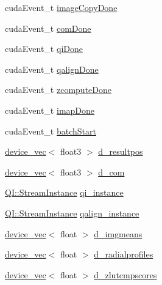 \begin{DoxyCompactItemize}
\item 
cuda\+Event\+\_\+t \hyperlink{struct_queued_c_u_d_a_tracker_1_1_stream_aca5f13276c563f05d5bf931de3fadc37}{image\+Copy\+Done}
\item 
cuda\+Event\+\_\+t \hyperlink{struct_queued_c_u_d_a_tracker_1_1_stream_a00f82cbaf986970a7a37ab1b667f9d70}{com\+Done}
\item 
cuda\+Event\+\_\+t \hyperlink{struct_queued_c_u_d_a_tracker_1_1_stream_a3bf78dd2104f2b82ecd8f1bc6697c818}{qi\+Done}
\item 
cuda\+Event\+\_\+t \hyperlink{struct_queued_c_u_d_a_tracker_1_1_stream_acfa8afce2f50edaab1379f929f250533}{qalign\+Done}
\item 
cuda\+Event\+\_\+t \hyperlink{struct_queued_c_u_d_a_tracker_1_1_stream_aa61e1ea38a74c9bd32435bd1ba0eb4d4}{zcompute\+Done}
\item 
cuda\+Event\+\_\+t \hyperlink{struct_queued_c_u_d_a_tracker_1_1_stream_a0a1e98ff17e435f2a4febdef69481cd0}{imap\+Done}
\item 
cuda\+Event\+\_\+t \hyperlink{struct_queued_c_u_d_a_tracker_1_1_stream_ae3b2a9742d05cd5fc60233c8db8e0230}{batch\+Start}
\item 
\hyperlink{classdevice__vec}{device\+\_\+vec}$<$ float3 $>$ \hyperlink{struct_queued_c_u_d_a_tracker_1_1_stream_a1dc9a73b31e5bcef0003932f6ca84a65}{d\+\_\+resultpos}
\item 
\hyperlink{classdevice__vec}{device\+\_\+vec}$<$ float3 $>$ \hyperlink{struct_queued_c_u_d_a_tracker_1_1_stream_aed4fcb91ae993d720cbb4662afa4f644}{d\+\_\+com}
\item 
\hyperlink{struct_q_i_1_1_stream_instance}{Q\+I\+::\+Stream\+Instance} \hyperlink{struct_queued_c_u_d_a_tracker_1_1_stream_a16cdaac6b5c2739e950d7255fe5aa1a2}{qi\+\_\+instance}
\item 
\hyperlink{struct_q_i_1_1_stream_instance}{Q\+I\+::\+Stream\+Instance} \hyperlink{struct_queued_c_u_d_a_tracker_1_1_stream_a72be2c83d41fce0530463c07bf37e853}{qalign\+\_\+instance}
\item 
\hyperlink{classdevice__vec}{device\+\_\+vec}$<$ float $>$ \hyperlink{struct_queued_c_u_d_a_tracker_1_1_stream_a70ec8174f1c4c547c6c8b315c70a5514}{d\+\_\+imgmeans}
\item 
\hyperlink{classdevice__vec}{device\+\_\+vec}$<$ float $>$ \hyperlink{struct_queued_c_u_d_a_tracker_1_1_stream_a16050b06d8a08c292fc06c292efa8a16}{d\+\_\+radialprofiles}
\item 
\hyperlink{classdevice__vec}{device\+\_\+vec}$<$ float $>$ \hyperlink{struct_queued_c_u_d_a_tracker_1_1_stream_af740f229b42580b873f59ad5cd0b641a}{d\+\_\+zlutcmpscores}

\end{DoxyCompactItemize}
